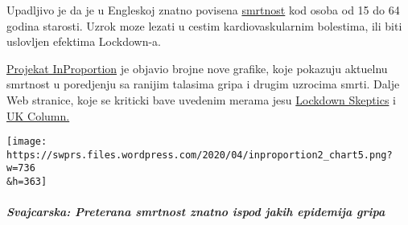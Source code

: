 Upadljivo je da je u Engleskoj znatno povisena
\href{https://www.euromomo.eu/}{smrtnost} kod osoba od 15 do 64 godina
starosti. Uzrok moze lezati u cestim kardiovaskularnim bolestima, ili
biti uslovljen efektima Lockdown-a.

\href{http://inproportion2.talkigy.com/}{Projekat InProportion} je
objavio brojne nove grafike, koje pokazuju aktuelnu smrtnost u
poredjenju sa ranijim talasima gripa i drugim uzrocima smrti. Dalje Web
stranice, koje se kriticki bave uvedenim merama jesu
\href{https://lockdownsceptics.org/}{Lockdown Skeptics} i
\href{https://www.ukcolumn.org/}{UK Column.}

\texttt{[image: https://swprs.files.wordpress.com/2020/04/inproportion2\_chart5.png?w=736\\\&h=363]}

\hypertarget{svajcarska-preterana-smrtnost-znatno-ispod-jakih-epidemija-gripa}{%
\subparagraph{\texorpdfstring{\textbf{Svajcarska: Preterana smrtnost
znatno ispod jakih epidemija
gripa}}{Svajcarska: Preterana smrtnost znatno ispod jakih epidemija gripa}}\label{svajcarska-preterana-smrtnost-znatno-ispod-jakih-epidemija-gripa}}

